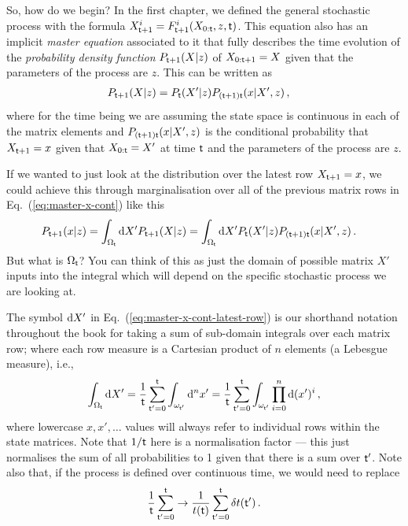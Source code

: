 So, how do we begin? In the first chapter, we defined the general stochastic process with the formula $X^{i}_{{\sf t}+1} = F^{i}_{{\sf t}+1}(X_{0:{\sf t}},z,{\sf t})$. This equation also has an implicit \emph{master equation} associated to it that fully describes the time evolution of the \emph{probability density function} $P_{{\sf t}+1}(X\vert z)$ of $X_{0:{\sf t}+1}=X$ given that the parameters of the process are $z$. This can be written as
\begin{align}
P_{{\sf t}+1}(X\vert z) &= P_{{\sf t}}(X'\vert z) P_{({\sf t}+1){\sf t}}(x\vert X',z) \label{eq:master-x-cont}\,,
\end{align}
where for the time being we are assuming the state space is continuous in each of the matrix elements and $P_{({\sf t}+1){\sf t}}(x\vert X',z)$ is the conditional probability that $X_{{\sf t}+1}=x$ given that $X_{0:{\sf t}}=X'$ at time ${\sf t}$ and the parameters of the process are $z$.

If we wanted to just look at the distribution over the latest row $X_{{\sf t}+1}=x$, we could achieve this through marginalisation over all of the previous matrix rows in Eq.~(\ref{eq:master-x-cont}) like this
\begin{align}
P_{{\sf t}+1}(x\vert z) = \int_{\Omega_{{\sf t}}}{\rm d}X' P_{{\sf t}+1}(X\vert z) &= \int_{\Omega_{{\sf t}}}{\rm d}X' P_{{\sf t}}(X'\vert z) P_{({\sf t}+1){\sf t}}(x\vert X',z) \label{eq:master-x-cont-latest-row} \,.
\end{align}
But what is $\Omega_{\sf t}$? You can think of this as just the domain of possible matrix $X'$ inputs into the integral which will depend on the specific stochastic process we are looking at. 

The symbol ${\rm d}X'$ in Eq.~(\ref{eq:master-x-cont-latest-row}) is our shorthand notation throughout the book for taking a sum of sub-domain integrals over each matrix row; where each row measure is a Cartesian product of $n$ elements (a Lebesgue measure), i.e.,
\begin{align}
\int_{\Omega_{{\sf t}}}{\rm d}X' = \frac{1}{{\sf t}}\sum_{{\sf t}'=0}^{{\sf t}} \int_{\omega_{{\sf t}'}}{\rm d}^nx' = \frac{1}{{\sf t}}\sum_{{\sf t}'=0}^{{\sf t}} \int_{\omega_{{\sf t}'}}\prod_{i=0}^n{\rm d}(x')^i \,,
\end{align}
where lowercase $x, x', \dots$ values will always refer to individual rows within the state matrices. Note that $1/{\sf t}$ here is a normalisation factor --- this just normalises the sum of all probabilities to 1 given that there is a sum over ${\sf t}'$. Note also that, if the process is defined over continuous time, we would need to replace 
\begin{align}
\frac{1}{{\sf t}}\sum_{{\sf t}'=0}^{{\sf t}} \rightarrow \frac{1}{t({\sf t})}\sum_{{\sf t}'=0}^{{\sf t}}\delta t({\sf t}') \,.
\end{align}


